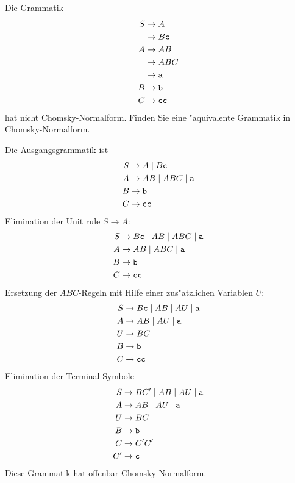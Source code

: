 Die Grammatik
\begin{align*}
S&\to A\\
 &\to B{\tt c}\\
A&\to AB\\
 &\to ABC\\
 &\to {\tt a}\\
B&\to {\tt b}\\
C&\to {\tt cc}
\end{align*}
hat nicht Chomsky-Normalform. Finden Sie eine "aquivalente Grammatik
in Chomsky-Normalform.

\begin{loesung}
Die Ausgangsgrammatik ist
\begin{align*}
S&\to A\;|\;B{\tt c}\\
A&\to AB\;|\;ABC\;|\;{\tt a}\\
B&\to {\tt b}\\
C&\to {\tt cc}
\end{align*}
Elimination der Unit rule $S\to A$:
\begin{align*}
S&\to B{\tt c}\;|\;AB\;|\;ABC\;|\;{\tt a}\\
A&\to AB\;|\;ABC\;|\;{\tt a}\\
B&\to {\tt b}\\
C&\to {\tt cc}
\end{align*}
Ersetzung der $ABC$-Regeln mit Hilfe einer zus"atzlichen
Variablen $U$:
\begin{align*}
S&\to B{\tt c}\;|\;AB\;|\;AU\;|\;{\tt a}\\
A&\to AB\;|\;AU\;|\;{\tt a}\\
U&\to BC\\
B&\to {\tt b}\\
C&\to {\tt cc}
\end{align*}
Elimination der Terminal-Symbole
\begin{align*}
S&\to BC'\;|\;AB\;|\;AU\;|\;{\tt a}\\
A&\to AB\;|\;AU\;|\;{\tt a}\\
U&\to BC\\
B&\to {\tt b}\\
C&\to C'C'\\
C'&\to {\tt c}\\
\end{align*}
Diese Grammatik hat offenbar Chomsky-Normalform.
\end{loesung}
